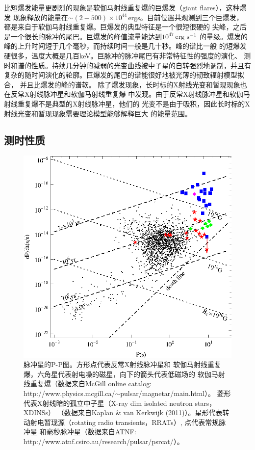 比短爆发能量更剧烈的现象是软伽马射线重复爆的巨爆发（giant flares），这种爆发
现象释放的能量在$\sim(2-500)\times10^{44}$\,ergs。目前位置共观测到三个巨爆发，
都是来自于软伽马射线重复爆\supercite{m08}。巨爆发的典型特征是一个很短很硬的
尖峰，之后是一个很长的脉冲的尾巴。巨爆发的峰值流量能达到$10^{47}$\,$\rm{erg\ s^{-1}}$
的量级。爆发的峰的上升时间短于几个毫秒，而持续时间一般是几十秒。峰的谱比一般
的短爆发硬很多，温度大概是几百keV。巨脉冲的脉冲尾巴有非常特征性的强度的演化、
测时和谱的性质。持续几分钟的减弱的光变曲线被中子星的自转强烈地调制，并且有
复杂的随时间演化的轮廓。巨爆发的尾巴的谱能很好地被光薄的韧致辐射模型拟合，
并且比爆发的峰的谱软。
%
除了爆发现象，长时标的X射线光变和暂现现象也在反常X射线脉冲星和软伽马射线重复爆
中发现。由于反常X射线脉冲星和软伽马射线重复爆不是典型的X射线脉冲星，他们的
光变不是由于吸积，因此长时标的X射线光变和暂现现象需要理论模型能够解释巨大
的能量范围。

\subsection{测时性质}

\begin{figure}
\centering
\includegraphics[width=12cm]{PPdot.eps}
\caption{脉冲星的P-$\mathrm{\dot{P}}$图\supercite{tx11}。方形点代表反常X射线脉冲星和
软伽马射线重复爆，六角星代表射电噪的磁星，向下的箭头代表低磁场的
软伽马射线重复爆（数据来自McGill online catalog:
http://www.physics.mcgill.ca/$\sim$pulsar/magnetar/main.html）。
菱形代表X射线暗的孤立中子星（X-ray dim isolated neutron stars，XDINSs）
（数据来自Kaplan \& van Kerkwijk (2011)\supercite{kv11}）。星形代表转
动射电暂现源（rotating radio transients，RRATs）, 点代表常规脉冲星
和毫秒脉冲星（数据来自ATNF: http://www.atnf.csiro.au/research/pulsar/psrcat/）。}
\label{PPdot}
\end{figure}

